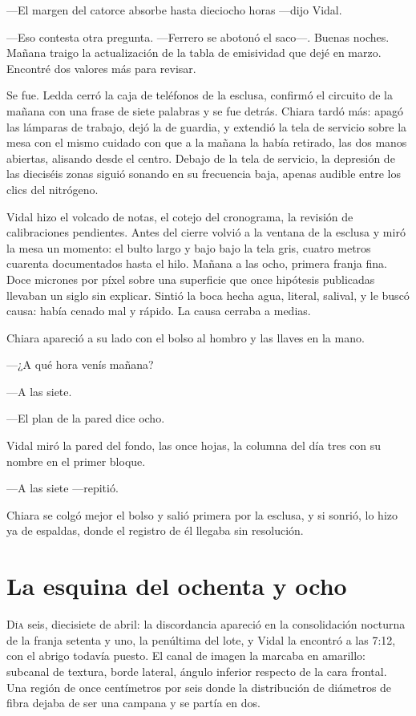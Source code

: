 ---El margen del catorce absorbe hasta dieciocho horas ---dijo Vidal.

---Eso contesta otra pregunta. ---Ferrero se abotonó el saco---. Buenas noches. Mañana traigo la actualización de la tabla de emisividad que dejé en marzo. Encontré dos valores más para revisar.

Se fue. Ledda cerró la caja de teléfonos de la esclusa, confirmó el circuito de la mañana con una frase de siete palabras y se fue detrás. Chiara tardó más: apagó las lámparas de trabajo, dejó la de guardia, y extendió la tela de servicio sobre la mesa con el mismo cuidado con que a la mañana la había retirado, las dos manos abiertas, alisando desde el centro. Debajo de la tela de servicio, la depresión de las dieciséis zonas siguió sonando en su frecuencia baja, apenas audible entre los clics del nitrógeno.

Vidal hizo el volcado de notas, el cotejo del cronograma, la revisión de calibraciones pendientes. Antes del cierre volvió a la ventana de la esclusa y miró la mesa un momento: el bulto largo y bajo bajo la tela gris, cuatro metros cuarenta documentados hasta el hilo. Mañana a las ocho, primera franja fina. Doce micrones por píxel sobre una superficie que once hipótesis publicadas llevaban un siglo sin explicar. Sintió la boca hecha agua, literal, salival, y le buscó causa: había cenado mal y rápido. La causa cerraba a medias.

Chiara apareció a su lado con el bolso al hombro y las llaves en la mano.

---¿A qué hora venís mañana?

---A las siete.

---El plan de la pared dice ocho.

Vidal miró la pared del fondo, las once hojas, la columna del día tres con su nombre en el primer bloque.

---A las siete ---repitió.

Chiara se colgó mejor el bolso y salió primera por la esclusa, y si sonrió, lo hizo ya de espaldas, donde el registro de él llegaba sin resolución.

\clearpage

\chapter{La esquina del ochenta y ocho}

\lettrine[lines=2, lhang=0.1, nindent=0.2em]{D}{ía} seis, diecisiete de abril: la discordancia apareció en la consolidación nocturna de la franja setenta y uno, la penúltima del lote, y Vidal la encontró a las 7:12, con el abrigo todavía puesto. El canal de imagen la marcaba en amarillo: subcanal de textura, borde lateral, ángulo inferior respecto de la cara frontal. Una región de once centímetros por seis donde la distribución de diámetros de fibra dejaba de ser una campana y se partía en dos.


